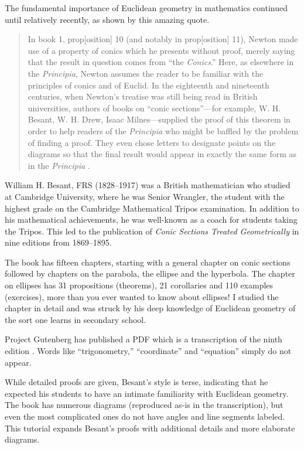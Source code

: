 The fundamental importance of Euclidean geometry in mathematics continued until relatively recently, as shown by this amazing quote.
\begin{quote}
In book 1, prop[osition] 10 (and notably in prop[osition] 11), Newton made use of a property of conics which he presents without proof, merely saying that the result in question comes from ``the \textit{Conics}.'' Here, as elsewhere in the \textit{Principia}, Newton assumes the reader to be familiar with the principles of conics and of Euclid. In the eighteenth and nineteenth centuries, when Newton's treatise was still being read in British universities, authors of books on ``conic sections''---for example, W. H. Besant, W. H. Drew, Isaac Milnes---supplied the proof of this theorem in order to help readers of the \textit{Principia} who might be baffled by the problem of finding a proof. They even chose letters to designate points on the diagrams so that the final result would appear in exactly the same form as in the \textit{Principia} \cite[p.~330]{newton-cohen}.
\end{quote}

William H. Besant, FRS (1828--1917) was a British mathematician who studied at Cambridge University, where he was Senior Wrangler, the student with the highest grade on the Cambridge Mathematical Tripos examination. In addition to his mathematical achievements, he was well-known as a coach for students taking the Tripos. This led to the publication of \textit{Conic Sections Treated Geometrically} in nine editions from 1869--1895.

The book has fifteen chapters, starting with a general chapter on conic sections followed by chapters on the parabola, the ellipse and the hyperbola. The chapter on ellipses has 31 propositions (theorems), 21 corollaries and 110 examples (exercises), more than you ever wanted to know about ellipses! I studied the chapter in detail and was struck by his deep knowledge of Euclidean geometry of the sort one learns in secondary school.

Project Gutenberg has published a PDF which is a transcription of the ninth edition \cite{besant}. Words like ``trigonometry,'' ``coordinate'' and ``equation'' simply do not appear.

While detailed proofs are given, Besant's style is terse, indicating that he expected his students to have an intimate familiarity with Euclidean geometry. The book has numerous diagrams (reproduced as-is in the transcription), but even the most complicated ones do not have angles and line segments labeled. This tutorial expands Besant's proofs with additional details and more elaborate diagrams.

